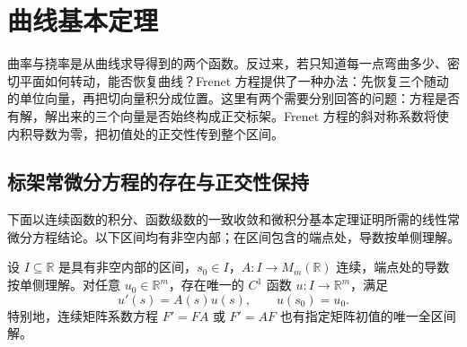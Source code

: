 
% 
% 

\section{曲线基本定理}
\label{g1:sec:0702}

曲率与挠率是从曲线求导得到的两个函数。反过来，若只知道每一点弯曲多少、密切平面如何转动，能否恢复曲线？Frenet 方程提供了一种办法：先恢复三个随动的单位向量，再把切向量积分成位置。这里有两个需要分别回答的问题：方程是否有解，解出来的三个向量是否始终构成正交标架。Frenet 方程的斜对称系数将使内积导数为零，把初值处的正交性传到整个区间。

\subsection{标架常微分方程的存在与正交性保持}
\label{g1:subsec:0702:01}

下面以连续函数的积分、函数级数的一致收敛和微积分基本定理证明所需的线性常微分方程结论。以下区间均有非空内部；在区间包含的端点处，导数按单侧理解。

\begin{lemma}
	\label{g1:lem:linear-frame-ode}
	设 \(I\subseteq\mathbb R\) 是具有非空内部的区间，\(s_0\in I\)，\(A\colon I\rightarrow M_m(\mathbb R)\) 连续，端点处的导数按单侧理解。对任意 \(u_0\in\mathbb R^m\)，存在唯一的 \(C^1\) 函数 \(u\colon I\rightarrow\mathbb R^m\)，满足
	\[
		u'(s)=A(s)u(s),\qquad u(s_0)=u_0.
	\]
	特别地，连续矩阵系数方程 \(F'=FA\) 或 \(F'=AF\) 也有指定矩阵初值的唯一全区间解。
\end{lemma}

